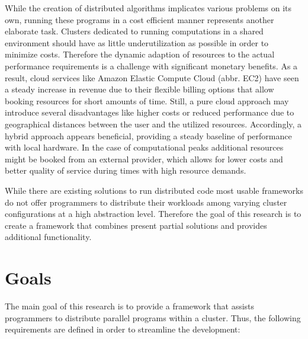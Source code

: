 While the creation of distributed algorithms implicates various problems on its own, running these programs in a cost efficient manner represents another elaborate task. Clusters dedicated to running computations in a shared environment should have as little underutilization as possible in order to minimize costs. Therefore the dynamic adaption of resources to the actual performance requirements is a challenge with significant monetary benefits. As a result, cloud services like Amazon Elastic Compute Cloud (abbr. EC2) have seen a steady increase in revenue due to their flexible billing options that allow booking resources for short amounts of time\cite{gartner_2017}. Still, a pure cloud approach may introduce several disadvantages like higher costs or reduced performance due to geographical distances between the user and the utilized resources. Accordingly, a hybrid approach appears beneficial, providing a steady baseline of performance with local hardware. In the case of computational peaks additional resources might be booked from an external provider, which allows for lower costs and better quality of service during times with high resource demands.

While there are existing solutions to run distributed code most usable frameworks do not offer programmers to distribute their workloads among varying cluster configurations at a high abstraction level. Therefore the goal of this research is to create a framework that combines present partial solutions and provides additional functionality.

\section{Goals}
\label{goals}
The main goal of this research is to provide a framework that assists programmers to distribute parallel programs within a cluster. Thus, the following requirements are defined in order to streamline the development:

